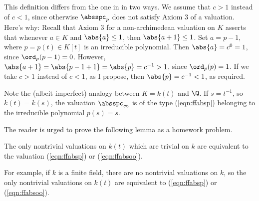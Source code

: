 This definition differs from the one in \cite[pg.~46]{cassels:global}
in two ways.  We assume that $c>1$ instead of $c<1$, since
otherwise $\absspc_p$ does not satisfy Axiom 3 of a valuation.  Here's
why: Recall that Axiom 3 for a non-archimedean valuation on $K$
asserts that whenever $a\in K$ and $\abs{a}\leq 1$, then
$\abs{a+1}\leq 1$.  Set $a=p-1$, where $p=p(t)\in K[t]$ is an
irreducible polynomial.  Then $\abs{a}=c^0 = 1$, since $\ord_p(p-1) =
0$.  However, $\abs{a+1} = \abs{p-1+1} = \abs{p}=c^{-1}>1$, since
$\ord_p(p) = 1$.  If we take $c>1$ instead of $c<1$, as I propose,
then $\abs{p}=c^{-1}<1$, as required.


Note the (albeit imperfect) analogy between $K=k(t)$ and $\Q$.
If $s=t^{-1}$, so $k(t)=k(s)$, the valuation $\absspc_{\infty}$
is of the type (\ref{eqn:ffabsp}) belonging to the irreducible
polynomial $p(s)=s$.

The reader is urged to prove the following lemma as a homework
problem.
\begin{lemma}
The only nontrivial valuations on $k(t)$ which are trivial
on $k$ are equivalent to the valuation (\ref{eqn:ffabsp})
or (\ref{eqn:ffabsoo}).
\end{lemma}
For example, if $k$ is a finite field, there are no
nontrivial valuations on $k$, so the only
nontrivial valuations on $k(t)$ are equivalent to 
(\ref{eqn:ffabsp}) or (\ref{eqn:ffabsoo}).




